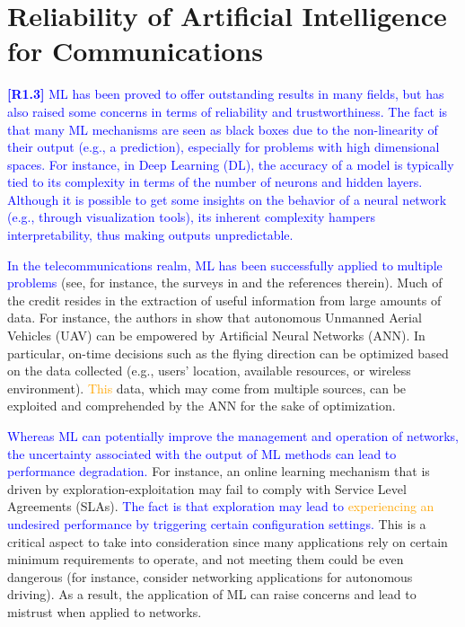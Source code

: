\documentclass[journal]{IEEEtran}
\begin{document}
	\section{Reliability of Artificial Intelligence for Communications}
	
	\textcolor{blue}{\textbf{[R1.3]} ML has been proved to offer outstanding results in many fields, but has also raised some concerns in terms of reliability and trustworthiness. The fact is that many ML mechanisms are seen as black boxes due to the non-linearity of their output (e.g., a prediction), especially for problems with high dimensional spaces. For instance, in Deep Learning (DL), the accuracy of a model is typically tied to its complexity in terms of the number of neurons and hidden layers. Although it is possible to get some insights on the behavior of a neural network (e.g., through visualization tools), its inherent complexity hampers interpretability, thus making outputs unpredictable.}
	
	\textcolor{blue}{In the telecommunications realm, ML has been successfully applied to multiple problems} (see, for instance, the surveys in \cite{survey2,survey3,survey4,survey5,survey6} and the references therein). Much of the credit resides in the extraction of useful information from large amounts of data. For instance, the authors in \cite{survey4} show that autonomous Unmanned Aerial Vehicles (UAV) can be empowered by Artificial Neural Networks (ANN). In particular, on-time decisions such as the flying direction can be optimized based on the data collected (e.g., users' location, available resources, or wireless environment). \textcolor{orange}{This} data, which may come from multiple sources, can be exploited and comprehended by the ANN for the sake of optimization.
	
	\textcolor{blue}{Whereas ML can potentially improve the management and operation of networks, the uncertainty associated with the output of ML methods can lead to performance degradation.} For instance, an online learning mechanism that is driven by exploration-exploitation may fail to comply with Service Level Agreements (SLAs). \textcolor{blue}{The fact is that exploration may lead to \textcolor{orange}{experiencing an} undesired performance by triggering certain configuration settings.} This is a critical aspect to take into consideration since many applications rely on certain minimum requirements to operate, and not meeting them could be even dangerous (for instance, consider networking applications for autonomous driving). As a result, the application of ML can raise concerns and lead to mistrust when applied to networks.
	
\end{document}
